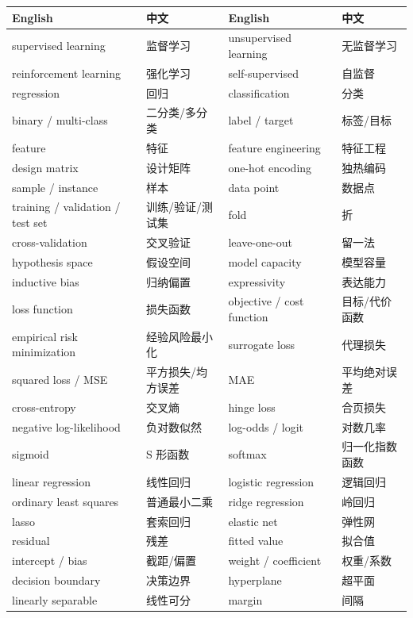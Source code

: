 \documentclass[UTF8,a4paper,11pt]{ctexart}
\theoremstyle{definition}
\theoremstyle{plain}
\theoremstyle{remark}
\begin{document}
\begin{center}
\small
\setlength{\tabcolsep}{3pt}
\begin{tabular}{@{}llll@{}}
\toprule
English & 中文 & English & 中文\\
\midrule
supervised learning & 监督学习 & unsupervised learning & 无监督学习\\
reinforcement learning & 强化学习 & self-supervised & 自监督\\
regression & 回归 & classification & 分类\\
binary / multi-class & 二分类/多分类 & label / target & 标签/目标\\
feature & 特征 & feature engineering & 特征工程\\
design matrix & 设计矩阵 & one-hot encoding & 独热编码\\
sample / instance & 样本 & data point & 数据点\\
training / validation / test set & 训练/验证/测试集 & fold & 折\\
cross-validation & 交叉验证 & leave-one-out & 留一法\\
hypothesis space & 假设空间 & model capacity & 模型容量\\
inductive bias & 归纳偏置 & expressivity & 表达能力\\
loss function & 损失函数 & objective / cost function & 目标/代价函数\\
empirical risk minimization & 经验风险最小化 & surrogate loss & 代理损失\\
squared loss / MSE & 平方损失/均方误差 & MAE & 平均绝对误差\\
cross-entropy & 交叉熵 & hinge loss & 合页损失\\
negative log-likelihood & 负对数似然 & log-odds / logit & 对数几率\\
sigmoid & S 形函数 & softmax & 归一化指数函数\\
linear regression & 线性回归 & logistic regression & 逻辑回归\\
ordinary least squares & 普通最小二乘 & ridge regression & 岭回归\\
lasso & 套索回归 & elastic net & 弹性网\\
residual & 残差 & fitted value & 拟合值\\
intercept / bias & 截距/偏置 & weight / coefficient & 权重/系数\\
decision boundary & 决策边界 & hyperplane & 超平面\\
linearly separable & 线性可分 & margin & 间隔\\

\end{tabular}
\end{center}
\end{document}
